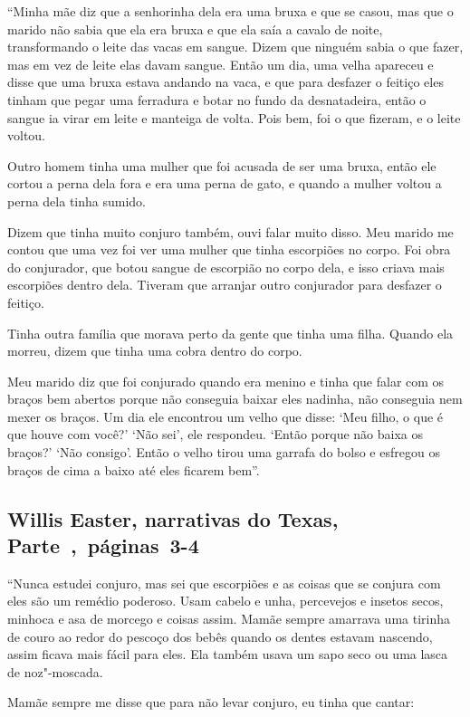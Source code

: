 ``Minha mãe diz que a senhorinha dela era uma bruxa e que se casou, mas
que o marido não sabia que ela era bruxa e que ela saía a cavalo de
noite, transformando o leite das vacas em sangue. Dizem que ninguém
sabia o que fazer, mas em vez de leite elas davam sangue. Então um dia,
uma velha apareceu e disse que uma bruxa estava andando na vaca, e que
para desfazer o feitiço eles tinham que pegar uma ferradura e botar no
fundo da desnatadeira, então o sangue ia virar em leite e manteiga de
volta. Pois bem, foi o que fizeram, e o leite voltou.

Outro homem tinha uma mulher que foi acusada de ser uma bruxa, então ele
cortou a perna dela fora e era uma perna de gato, e quando a mulher
voltou a perna dela tinha sumido.

Dizem que tinha muito conjuro também, ouvi falar muito disso. Meu marido
me contou que uma vez foi ver uma mulher que tinha escorpiões no corpo.
Foi obra do conjurador, que botou sangue de escorpião no corpo dela, e
isso criava mais escorpiões dentro dela. Tiveram que arranjar outro
conjurador para desfazer o feitiço.

Tinha outra família que morava perto da gente que tinha uma filha.
Quando ela morreu, dizem que tinha uma cobra dentro do corpo.

Meu marido diz que foi conjurado quando era menino e tinha que falar com
os braços bem abertos porque não conseguia baixar eles nadinha, não
conseguia nem mexer os braços. Um dia ele encontrou um velho que disse:
`Meu filho, o que é que houve com você?' `Não sei', ele respondeu.
`Então porque não baixa os braços?' `Não consigo'. Então o velho tirou
uma garrafa do bolso e esfregou os braços de cima a baixo até eles
ficarem bem''.

\subsection{Willis Easter, narrativas do Texas, Parte~,~páginas~3-4} \label{ref79}

``Nunca estudei conjuro, mas sei que escorpiões e as coisas que se
conjura com eles são um remédio poderoso. Usam cabelo e unha, percevejos
e insetos secos, minhoca e asa de morcego e coisas assim. Mamãe sempre
amarrava uma tirinha de couro ao redor do pescoço dos bebês quando os
dentes estavam nascendo, assim ficava mais fácil para eles. Ela também
usava um sapo seco ou uma lasca de noz"-moscada.

Mamãe sempre me disse que para não levar conjuro, eu tinha que cantar:

